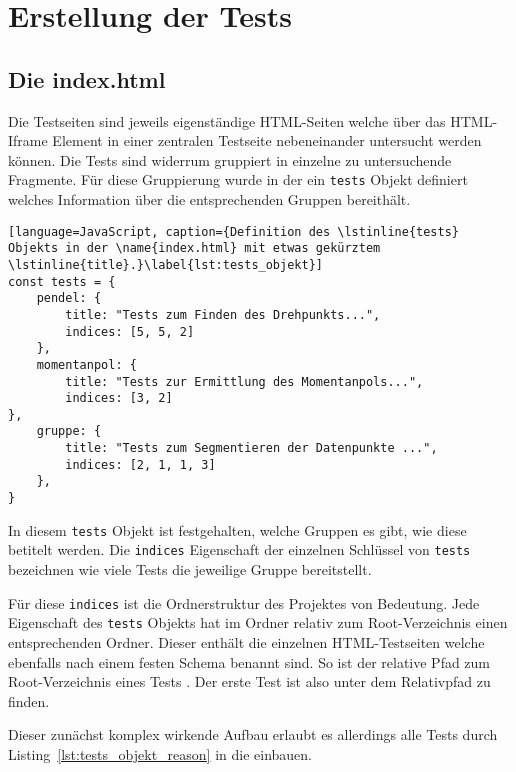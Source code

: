 \chapter{Erstellung der Tests}

\section{Die index.html}

Die Testseiten sind jeweils eigenständige HTML-Seiten welche über das HTML-Iframe Element in einer zentralen Testseite nebeneinander untersucht werden können.
Die Tests sind widerrum gruppiert in einzelne zu untersuchende Fragmente.
Für diese Gruppierung wurde in der  ein \lstinline{tests} Objekt definiert welches Information über die entsprechenden Gruppen bereithält.

\begin{lstlisting}[language=JavaScript, caption={Definition des \lstinline{tests} Objekts in der \name{index.html} mit etwas gekürztem \lstinline{title}.}\label{lst:tests_objekt}]
const tests = {
    pendel: {
        title: "Tests zum Finden des Drehpunkts...",
        indices: [5, 5, 2]
    },
    momentanpol: {
        title: "Tests zur Ermittlung des Momentanpols...",
        indices: [3, 2]
},
    gruppe: {
        title: "Tests zum Segmentieren der Datenpunkte ...",
        indices: [2, 1, 1, 3]
    },
}
\end{lstlisting}

In diesem \lstinline{tests} Objekt ist festgehalten, welche Gruppen es gibt, wie diese betitelt werden. Die \lstinline{indices} Eigenschaft der einzelnen Schlüssel von \lstinline{tests} bezeichnen wie viele Tests die jeweilige Gruppe bereitstellt.


Für diese \lstinline{indices} ist die Ordnerstruktur des Projektes von Bedeutung.
Jede Eigenschaft des \lstinline{tests} Objekts hat im  Ordner relativ zum Root-Verzeichnis einen entsprechenden Ordner.
Dieser enthält die einzelnen HTML-Testseiten welche ebenfalls nach einem festen Schema benannt sind.
So ist der relative Pfad zum Root-Verzeichnis eines Tests .
Der erste Test ist also unter dem Relativpfad  zu finden.

Dieser zunächst komplex wirkende Aufbau erlaubt es allerdings alle Tests durch Listing~\ref{lst:tests_objekt_reason} in die  einbauen.

